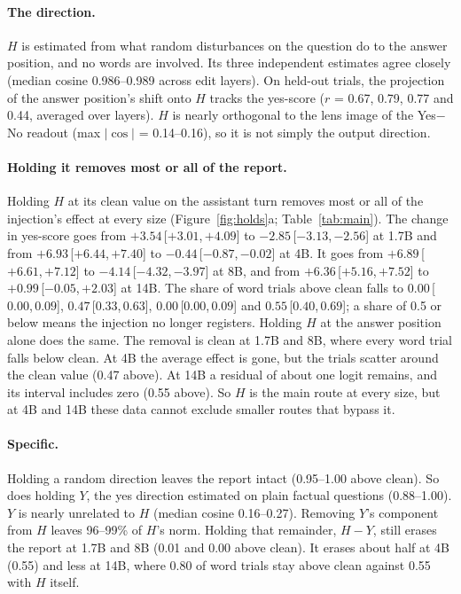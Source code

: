 \documentclass[11pt]{article}
\newcommand{\ci}[3]{\ensuremath{#1}\,[\ensuremath{#2},\allowbreak\,\ensuremath{#3}]}
\newcommand{\ys}{yes-score}
\begin{document}
\paragraph{The direction.} $H$ is estimated from what random disturbances on the question do to the answer position, and no words are involved. Its three independent estimates agree closely (median cosine 0.986--0.989 across edit layers). On held-out trials, the projection of the answer position's shift onto $H$ tracks the \ys{} ($r$ = 0.67, 0.79, 0.77 and 0.44, averaged over layers). $H$ is nearly orthogonal to the lens image of the Yes$-$No readout (max $|\cos|$ = 0.14--0.16), so it is not simply the output direction.

\paragraph{Holding it removes most or all of the report.} Holding $H$ at its clean value on the assistant turn removes most or all of the injection's effect at every size (Figure~\ref{fig:holds}a; Table~\ref{tab:main}). The change in \ys{} goes from \ci{+3.54}{+3.01}{+4.09} to \ci{-2.85}{-3.13}{-2.56} at 1.7B and from \ci{+6.93}{+6.44}{+7.40} to \ci{-0.44}{-0.87}{-0.02} at 4B. It goes from \ci{+6.89}{+6.61}{+7.12} to \ci{-4.14}{-4.32}{-3.97} at 8B, and from \ci{+6.36}{+5.16}{+7.52} to \ci{+0.99}{-0.05}{+2.03} at 14B. The share of word trials above clean falls to \ci{0.00}{0.00}{0.09}, \ci{0.47}{0.33}{0.63}, \ci{0.00}{0.00}{0.09} and \ci{0.55}{0.40}{0.69}; a share of 0.5 or below means the injection no longer registers. Holding $H$ at the answer position alone does the same. The removal is clean at 1.7B and 8B, where every word trial falls below clean. At 4B the average effect is gone, but the trials scatter around the clean value (0.47 above). At 14B a residual of about one logit remains, and its interval includes zero (0.55 above). So $H$ is the main route at every size, but at 4B and 14B these data cannot exclude smaller routes that bypass it.

\paragraph{Specific.} Holding a random direction leaves the report intact (0.95--1.00 above clean). So does holding $Y$, the yes direction estimated on plain factual questions (0.88--1.00). $Y$ is nearly unrelated to $H$ (median cosine 0.16--0.27). Removing $Y$'s component from $H$ leaves 96--99\% of $H$'s norm. Holding that remainder, $H-Y$, still erases the report at 1.7B and 8B (0.01 and 0.00 above clean). It erases about half at 4B (0.55) and less at 14B, where 0.80 of word trials stay above clean against 0.55 with $H$ itself.
\end{document}
